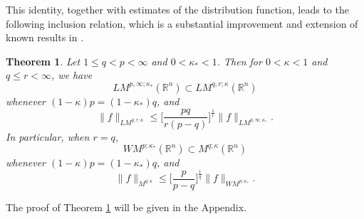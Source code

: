 \documentclass{birkjour}
\newtheorem{thm}{Theorem}[section]
\theoremstyle{definition}
\theoremstyle{remark}
\numberwithin{equation}{section}
\begin{document}
This identity, together with estimates of the distribution function, leads to the following inclusion relation, which is a substantial improvement and extension of known results in \cite[Theorem 1.1]{gun}.
\begin{thm}\label{appendix}
Let $1\leq q<p<\infty$ and $0<\kappa_{*}<1$. Then for $0<\kappa<1$ and $q\leq r<\infty$, we have
\begin{equation*}
LM^{p,\infty;\kappa_{*}}(\mathbb R^n)\subset LM^{q,r;\kappa}(\mathbb R^n)
\end{equation*}
whenever $(1-\kappa)p=(1-\kappa_*)q$, and
\begin{equation*}
\|f\|_{LM^{q,r;\kappa}}\leq \Big[\frac{pq}{r(p-q)}\Big]^{\frac{1}{r}}\|f\|_{LM^{p,\infty;\kappa_{*}}}.
\end{equation*}
In particular, when $r=q$,
\begin{equation*}
WM^{p;\kappa_{*}}(\mathbb R^n)\subset M^{q;\kappa}(\mathbb R^n)
\end{equation*}
whenever $(1-\kappa)p=(1-\kappa_{*})q$, and
\begin{equation*}
\|f\|_{M^{q;\kappa}}\leq \Big[\frac{p}{p-q}\Big]^{\frac{1}{q}}\|f\|_{WM^{p;\kappa_{*}}}.
\end{equation*}
\end{thm}
The proof of Theorem \ref{appendix} will be given in the Appendix.
\end{document}
